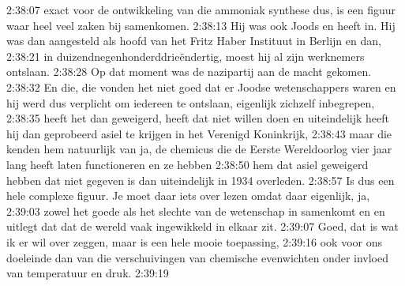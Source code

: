 2:38:07
exact voor de ontwikkeling van die ammoniak synthese dus, is een figuur waar heel veel zaken bij samenkomen.
2:38:13
Hij was ook Joods en heeft in. Hij was dan aangesteld als hoofd van het Fritz Haber Instituut in Berlijn en dan,
2:38:21
in duizendnegenhonderddrieëndertig, moest hij al zijn werknemers ontslaan.
2:38:28
Op dat moment was de nazipartij aan de macht gekomen.
2:38:32
En die, die vonden het niet goed dat er Joodse wetenschappers waren en hij werd dus verplicht om iedereen te ontslaan, eigenlijk zichzelf inbegrepen,
2:38:35
heeft het dan geweigerd, heeft dat niet willen doen en uiteindelijk heeft hij dan geprobeerd asiel te krijgen in het Verenigd Koninkrijk,
2:38:43
maar die kenden hem natuurlijk van ja, de chemicus die de Eerste Wereldoorlog vier jaar lang heeft laten functioneren en ze hebben
2:38:50
hem dat asiel geweigerd hebben dat niet gegeven is dan uiteindelijk in 1934 overleden.
2:38:57
Is dus een hele complexe figuur. Je moet daar iets over lezen omdat daar eigenlijk, ja,
2:39:03
zowel het goede als het slechte van de wetenschap in samenkomt en en uitlegt dat dat de wereld vaak ingewikkeld in elkaar zit.
2:39:07
Goed, dat is wat ik er wil over zeggen, maar is een hele mooie toepassing,
2:39:16
ook voor ons doeleinde dan van die verschuivingen van chemische evenwichten onder invloed van temperatuur en druk.
2:39:19


